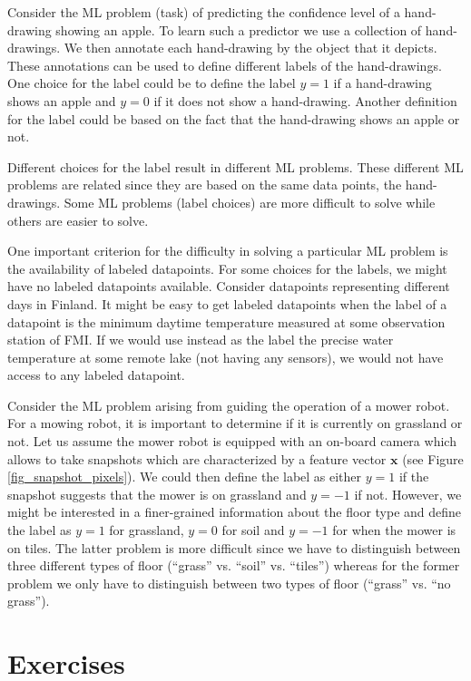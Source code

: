 \documentclass[12pt]{report}
\begin{document}
Consider the ML problem (task) of predicting the confidence level 
of a hand-drawing showing an apple. To learn such a predictor we 
use a collection of hand-drawings. We then annotate each hand-drawing 
by the object that it depicts. These annotations can be used to define 
different labels of the hand-drawings. One choice for the label could 
be to define the label $y=1$ if a hand-drawing shows an apple and 
$y=0$ if it does not show a hand-drawing. Another definition for 
the label could be based on the fact that the hand-drawing shows 
an apple or not. 


Different choices for the label result in different ML problems. These 
different ML problems are related since they are based on the same data 
points, the hand-drawings. Some ML problems (label choices) are more 
difficult to solve while others are easier to solve. 

One important criterion for the difficulty in solving a particular ML problem 
is the availability of labeled datapoints. For some choices for the labels, we 
might have no labeled datapoints available. Consider datapoints representing 
different days in Finland. It might be easy to get labeled datapoints when the 
label of a datapoint is the minimum daytime temperature measured at some 
observation station of FMI. If we would use instead as the label the precise 
water temperature at some remote lake (not having any sensors), we would 
not have access to any labeled datapoint. 


Consider the ML problem arising from guiding the operation of a mower robot. 
For a mowing robot, it is important to determine if it is currently on grassland 
or not. Let us assume the mower robot is equipped with an on-board camera 
which allows to take snapshots which are characterized by a feature vector 
$\mathbf{x}$ (see Figure \ref{fig_snapshot_pixels}). We could then define the 
label as either $y=1$ if the snapshot suggests that the mower is on grassland 
and $y=-1$ if not. However, we might be interested in a finer-grained information 
about the floor type and define the label as $y=1$ for grassland, 
$y=0$ for soil and $y=-1$ for when the mower is on tiles. The latter problem is 
more difficult since we have to distinguish between three different types of 
floor (``grass'' vs. ``soil'' vs. ``tiles'') whereas for the former problem we only 
have to distinguish between two types of floor (``grass'' vs. ``no grass''). 


\section{Exercises} 
\end{document}
